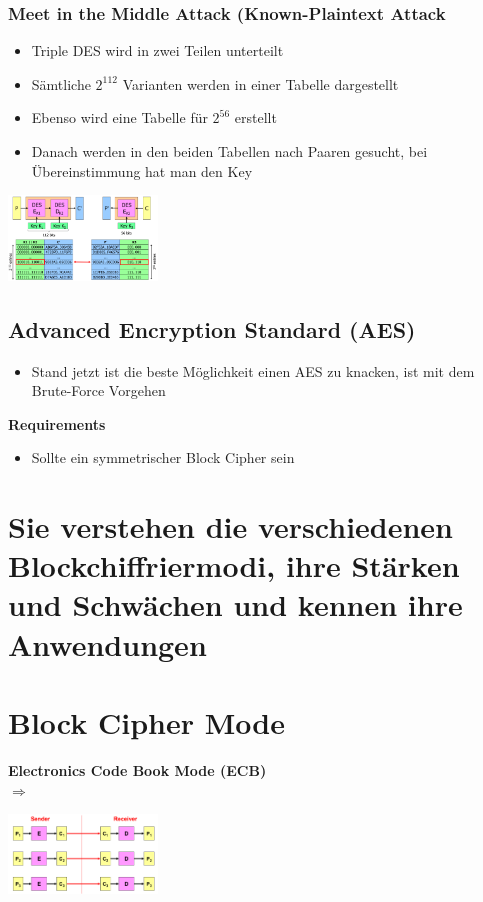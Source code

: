 \documentclass{report}
\newenvironment{Figure}
	{\par\medskip\noindent\minipage{\linewidth}}
	{\endminipage\par\medskip}
\theoremstyle{definition}
\theoremstyle{example}
\begin{document}
		\subsubsection{Meet in the Middle Attack (Known-Plaintext Attack}
\begin{itemize}
	\item Triple DES wird in zwei Teilen unterteilt
	\item Sämtliche $2^112$ Varianten werden in einer Tabelle dargestellt
	\item Ebenso wird eine Tabelle für $2^56$ erstellt
	\item Danach werden in den beiden Tabellen nach Paaren gesucht, bei Übereinstimmung hat man den Key
\end{itemize}

\begin{Figure}
\centering
\includegraphics[width=150px]{img/MeetInTheMiddleAttack.png}
	\label{fig:Meet in the Middle Attack}
\end{Figure}

	\subsection{Advanced Encryption Standard (AES)}
\begin{itemize}
	\item Stand jetzt ist die beste Möglichkeit einen AES zu knacken, ist mit dem Brute-Force Vorgehen
\end{itemize}

\textbf{Requirements}\\
\begin{itemize}
	\item Sollte ein symmetrischer Block Cipher sein
\end{itemize}



\section{Sie verstehen die verschiedenen Blockchiffriermodi, ihre Stärken und Schwächen und kennen ihre Anwendungen}

	\section{Block Cipher Mode}
\textbf{Electronics Code Book Mode (ECB)}\\
$\Rightarrow$ 
\begin{Figure}
\centering
\includegraphics[width=150px]{img/ECB.png}
	\label{fig:Meet in the Middle Attack}
\end{Figure}
\end{document}
